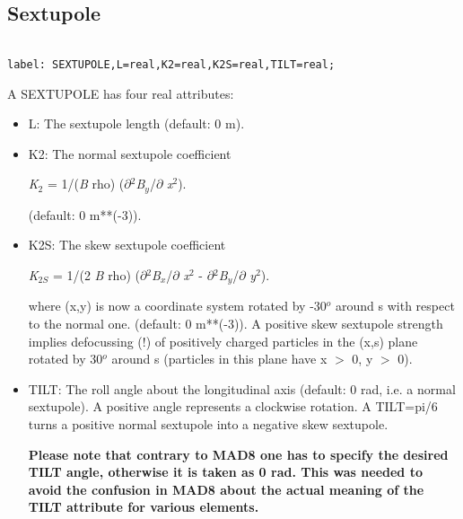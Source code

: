 





\subsection{Sextupole}
\begin{verbatim}

label: SEXTUPOLE,L=real,K2=real,K2S=real,TILT=real;
\end{verbatim} A SEXTUPOLE has four real attributes: 
\begin{itemize}
	\item L: The sextupole length (default: 0 m). 
	\item K2: The normal sextupole coefficient 

\textit{K}$_2$ = 1/(\textit{B} rho) ($\partial$$^2$\textit{B$_y$}/$\partial$ \textit{x}$^2$). 

 (default: 0 m**(-3)). 
	\item K2S: The skew sextupole coefficient 

\textit{K}$_{2S}$ = 1/(2 \textit{B} rho) ($\partial$$^2$\textit{B$_x$}/$\partial$ \textit{x}$^2$ - $\partial$$^2$\textit{B$_y$}/$\partial$ \textit{y}$^2$). 

 where (x,y) is now a coordinate system rotated by -30$^o$ around s with respect to the normal one. (default: 0 m**(-3)). A positive skew sextupole strength implies defocussing (!) of positively charged particles in the (x,s) plane rotated by 30$^o$ around s (particles in this plane have x $>$ 0, y $>$ 0). 


	\item TILT: The roll angle about the longitudinal axis (default: 0 rad, i.e. a normal sextupole). A positive angle represents a clockwise rotation. A TILT=pi/6 turns a positive normal sextupole into a negative skew sextupole. 

\textbf{  Please note that contrary to MAD8 one has to specify the desired TILT angle, otherwise it is taken as 0 rad. This was needed to avoid the confusion in MAD8 about the actual meaning of the TILT attribute for various elements. }
\end{itemize}

